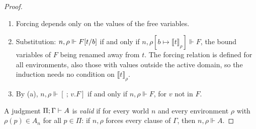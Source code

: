 \begin{proof}
\begin{enumerate}[label=\textup{(\alph*)}]
 the same for clauses.  Equations do not depend on the world; for
 $\D{x}{y}B$ the witness $a\in A_n\subseteq A_{n'}$ is kept, and the
 condition at $n'$ quantifies over fewer worlds $m$.
\item Forcing depends only on the values of the free variables.
\item Substitution: $n,\rho\Vdash F[t/b]$ if and only if
 $n,\rho[b\mapsto\llbracket t\rrbracket_\rho]\Vdash F$, the bound variables of
 $F$ being renamed away from $t$.  The forcing relation is defined for all
 environments, also those with values outside the active domain, so the
 induction needs no condition on $\llbracket t\rrbracket_\rho$.
\item By (a), $n,\rho\Vdash[\ ;\,v.F]$ if and only if $n,\rho\Vdash F$, for
 $v$ not in $F$.
\end{enumerate}
A judgment $\Pi;\Gamma\vdash A$ is \emph{valid} if for every world $n$ and
every environment $\rho$ with $\rho(p)\in A_n$ for all $p\in\Pi$: if
$n,\rho$ forces every clause of $\Gamma$, then $n,\rho\Vdash A$.


\end{proof}
